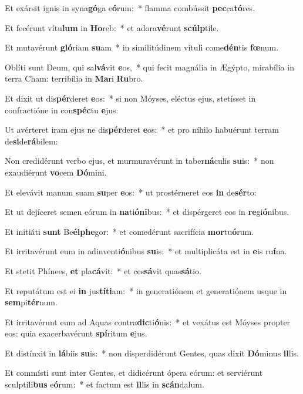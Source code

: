 \item Et exársit ignis in syna\textbf{gó}ga e\textbf{ó}rum:~* flamma combússit \textbf{pec}ca\textbf{tó}res.
\item Et fecérunt vítu\textbf{lum} in \textbf{Ho}reb:~* et adora\textbf{vé}runt \textbf{scúlp}tile.
\item Et mutavérunt \textbf{gló}riam \textbf{su}am~* in similitúdinem vítuli come\textbf{dén}tis \textbf{fœ}num.
\item Oblíti sunt Deum, qui sal\textbf{vá}vit \textbf{e}os,~* qui fecit magnália in Ægýpto, mirabília in terra Cham: terribília in \textbf{Ma}ri \textbf{Ru}bro.
\item Et dixit ut dis\textbf{pér}deret \textbf{e}os:~* si non Móyses, eléctus ejus, stetísset in confractióne in con\textbf{spéc}tu \textbf{e}jus:
\item Ut avérteret iram ejus ne dis\textbf{pér}deret \textbf{e}os:~* et pro níhilo habuérunt terram de\textbf{si}de\textbf{rá}bilem:
\item Non credidérunt verbo ejus, et murmuravérunt in taber\textbf{ná}culis \textbf{su}is:~* non exaudiérunt \textbf{vo}cem \textbf{Dó}mini.
\item Et elevávit manum suam \textbf{su}per \textbf{e}os:~* ut prostérneret eos \textbf{in} de\textbf{sér}to:
\item Et ut dejíceret semen eórum in \textbf{na}ti\textbf{ó}\textbf{ni}bus:~* et dispérgeret eos in \textbf{re}gi\textbf{ó}nibus.
\item Et initiáti \textbf{sunt} Be\textbf{él}\textbf{phe}gor:~* et comedérunt sacrifícia \textbf{mor}tu\textbf{ó}rum.
\item Et irritavérunt eum in adinventi\textbf{ó}nibus \textbf{su}is:~* et multiplicáta est in \textbf{e}is ru\textbf{í}na.
\item Et stetit Phínees, \textbf{et} pla\textbf{cá}vit:~* et ces\textbf{sá}vit quas\textbf{sá}tio.
\item Et reputátum est ei \textbf{in} jus\textbf{tí}\textbf{ti}am:~* in generatiónem et generatiónem usque in \textbf{sem}pi\textbf{tér}num.
\item Et irritavérunt eum ad Aquas contra\textbf{dic}ti\textbf{ó}nis:~* et vexátus est Móyses propter eos: quia exacerbavérunt \textbf{spí}ritum \textbf{e}jus.
\item Et distínxit in \textbf{lá}biis \textbf{su}is:~* non disperdidérunt Gentes, quas dixit \textbf{Dó}minus \textbf{il}lis.
\item Et commísti sunt inter Gentes, et didicérunt ópera eórum: et serviérunt sculptíli\textbf{bus} e\textbf{ó}rum:~* et factum est \textbf{il}lis in \textbf{scán}dalum.
